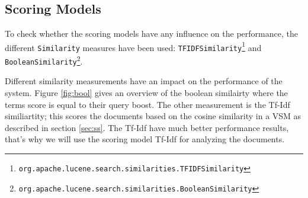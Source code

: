 \documentclass[11pt]{article}
\begin{document}
\subsection{Scoring Models}\label{sec:scmodels}
To check whether the scoring models have any influence on the performance, the different \texttt{Similarity} measures have been used: \texttt{TFIDFSimilarity}\footnote{\texttt{org.apache.lucene.search.similarities.TFIDFSimilarity}} and \texttt{BooleanSimilarity}\footnote{\texttt{org.apache.lucene.search.similarities.BooleanSimilarity}}. 

Different similarity measurements have an impact on the performance of the system. Figure \ref{fig:bool} gives an overview of the boolean similairty where the terms score is equal to their query boost. The other measurement is the Tf-Idf similiartity; this scores the documents based on the cosine similarity in a VSM as described in section \ref{sec:ss}. The Tf-Idf have much better performance results, that's why we will use the scoring model Tf-Idf for analyzing the documents.
\end{document}
